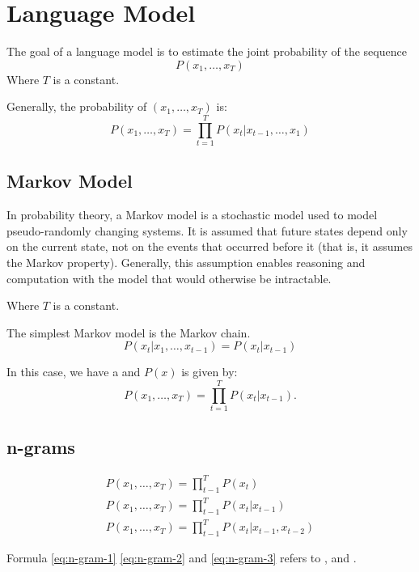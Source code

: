 
\chapter{Language Model}
\label{cha:language-model}

The goal of a language model is to estimate the joint probability of the sequence
\begin{equation}
  \label{eq:language-model}
  P(x_{1},\ldots,x_{T})
\end{equation}
Where \(T\) is a constant.


Generally, the probability of \((x_{1},\ldots,x_{T})\) is:
\begin{equation}
  \label{eq:language-model-p}
  P(x_{1},\ldots,x_{T}) = \prod_{t=1}^{T}P(x_{t}|x_{t-1},\ldots,x_{1})
\end{equation}

\section{Markov Model}
\label{sec:markov-model}


In probability theory, a Markov model is a stochastic model used to model pseudo-randomly changing systems.
It is assumed that future states depend only on the current state, not on the events that occurred before it (that is, it assumes the Markov property).
Generally, this assumption enables reasoning and computation with the model that would otherwise be intractable.

Where \(T\) is a constant.



The simplest Markov model is the Markov chain.
\begin{equation}
  \label{eq:markov-chain}
  P(x_{t}|x_{1},\ldots,x_{t-1}) = P(x_{t}|x_{t-1})
\end{equation}

In this case, we have a  and \(P(x)\) is given by:
\begin{equation}
  \label{eq:first-order-markov-model}
  P(x_{1},\ldots,x_{T}) = \prod_{t=1}^{T} P(x_{t}|x_{t-1}).
\end{equation}

\section{n-grams}
\label{sec:n-grams}

\begin{gather}
  \label{eq:n-gram-1}
  P(x_{1},\ldots,x_{T}) = \prod_{t-1}^{T} P(x_{t})\\
  \label{eq:n-gram-2}
  P(x_{1},\ldots,x_{T}) = \prod_{t-1}^{T} P(x_{t}|x_{t-1})\\ 
  \label{eq:n-gram-3} 
  P(x_{1},\ldots,x_{T}) = \prod_{t-1}^{T} P(x_{t}|x_{t-1},x_{t-2})
\end{gather}

Formula \ref{eq:n-gram-1} \ref{eq:n-gram-2} and \ref{eq:n-gram-3} refers to ,  and .





